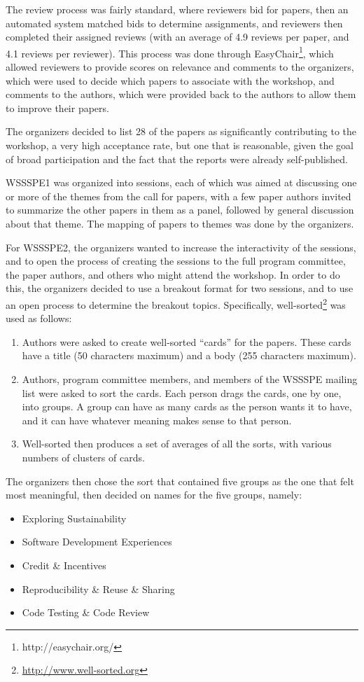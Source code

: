 \documentclass[11pt, oneside]{amsart}
\begin{document}
The review process was fairly standard, where reviewers bid for papers, then an
automated system
matched bids to determine assignments, and reviewers then completed their
assigned
reviews (with an average of 4.9 reviews per paper, and 4.1 reviews per
reviewer).
This process was done through EasyChair\footnote{http://easychair.org/}, which
allowed reviewers to provide scores on relevance and comments to the organizers,
which were used to decide which papers to associate with the workshop, and
comments to the authors, which were provided back to the authors to allow them
to improve their papers.

The organizers decided to list 28 of the papers as significantly contributing to
the workshop, a very high acceptance rate, but one that is reasonable, given the
goal of broad participation and the fact that the reports were already
self-published.

WSSSPE1 was organized into sessions, each of which was aimed at discussing one
or more of the themes from the call for papers, with a few paper authors invited
to summarize the other papers in them as a panel, followed by general
discussion about that theme. The mapping of papers to themes was done by the
organizers.

For WSSSPE2, the organizers wanted to increase the interactivity of the
sessions, and to open the process of creating the sessions to the full program
committee, the paper authors, and others who might attend the workshop. In order
to do this, the organizers decided to use a breakout format for two sessions,
and to use an open process to determine the breakout topics. Specifically,
well-sorted\footnote{\url{http://www.well-sorted.org}} was used as follows:
\begin{enumerate}
\item Authors were asked to create well-sorted ``cards'' for the papers. These
cards have a title (50 characters maximum) and a body (255 characters maximum).
\item Authors, program committee members, and members of the WSSSPE mailing list
were asked to sort the cards. Each person drags the cards, one by one, into
groups. A group can have as many cards as the person wants it to have, and it
can have whatever meaning makes sense to that person.
\item Well-sorted then produces a set of averages of all the sorts, with various
numbers of clusters of cards.
\end{enumerate}

The organizers then chose the sort that contained five groups as the one that
felt most meaningful, then decided on names for the five groups, namely:
\begin{itemize}
\item Exploring Sustainability
\item Software Development Experiences
\item Credit \& Incentives
\item Reproducibility \& Reuse \& Sharing
\item Code Testing \& Code Review
\end{itemize}
\end{document}
